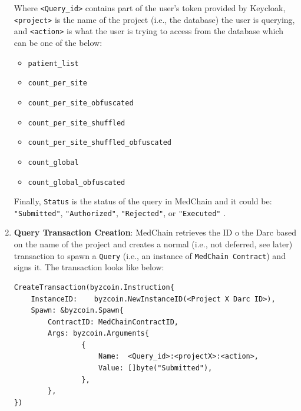\begin{enumerate}
  Where \texttt{<Query\_id>} contains part of the user's token provided by Keycloak, \texttt{<project>} is the name of the project (i.e., the database) the user is querying, and \texttt{<action>} is what the user is trying to access from the database which can be one of the below:
  \begin{itemize}
        \item \texttt{patient\_list}
        \item \texttt{count\_per\_site}
        \item \texttt{count\_per\_site\_obfuscated}
        \item \texttt{count\_per\_site\_shuffled}
        \item \texttt{count\_per\_site\_shuffled\_obfuscated}
        \item \texttt{count\_global}
        \item \texttt{count\_global\_obfuscated}
  \end{itemize}
   
  Finally, \texttt{Status} is the status of the query in MedChain and it could be: \texttt{"Submitted"}, \texttt{"Authorized"}, \texttt{"Rejected"}, or \texttt{"Executed"} .

    \item \textbf{Query Transaction Creation}: \label{workflow:step 5}
    MedChain retrieves the ID o the Darc based on the name of the project and creates a normal (i.e., not deferred, see later) transaction to spawn a \texttt{Query} (i.e., an instance of \texttt{MedChain Contract}) and signs it. The transaction looks like below:
        \begin{verbatim}
CreateTransaction(byzcoin.Instruction{
    InstanceID:    byzcoin.NewInstanceID(<Project X Darc ID>),
    Spawn: &byzcoin.Spawn{
        ContractID: MedChainContractID,
        Args: byzcoin.Arguments{
                {
                    Name:  <Query_id>:<projectX>:<action>,
                    Value: []byte("Submitted"),
                },
        },
})
        \end{verbatim}
        

\end{enumerate}
